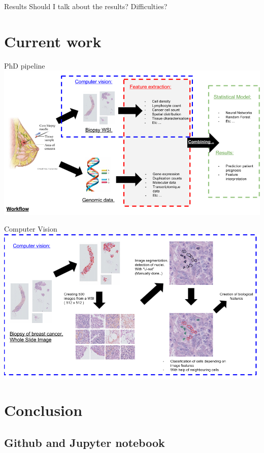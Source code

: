 \documentclass{beamer}
\begin{document}
\begin{frame}{Results}
Should I talk about the results?
Difficulties?
\end{frame}


\section{Current work}
\begin{frame}{PhD pipeline}
\includegraphics[width=\textwidth]{Workflow_overview.png}
\end{frame}
\begin{frame}{Computer Vision}
\includegraphics[width=\textwidth]{ComputerVision.png}
\end{frame}


\section{Conclusion}

\subsection{Github and Jupyter notebook}
\end{document}

